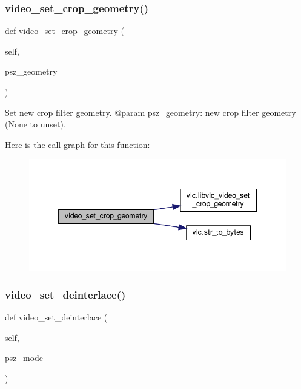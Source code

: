 \subsubsection{\texorpdfstring{video\+\_\+set\+\_\+crop\+\_\+geometry()}{video\_set\_crop\_geometry()}}
{\footnotesize\ttfamily def video\+\_\+set\+\_\+crop\+\_\+geometry (\begin{DoxyParamCaption}\item[{}]{self,  }\item[{}]{psz\+\_\+geometry }\end{DoxyParamCaption})}

\begin{DoxyVerb}Set new crop filter geometry.
@param psz_geometry: new crop filter geometry (None to unset).
\end{DoxyVerb}
 Here is the call graph for this function\+:
\nopagebreak
\begin{figure}[H]
\begin{center}
\leavevmode
\includegraphics[width=346pt]{classvlc_1_1_media_player_a8fb5c5ae9f3a3f03ff8b286a8b2f07f9_cgraph}
\end{center}
\end{figure}
\mbox{\label{classvlc_1_1_media_player_a7e7401a9ec141adb28bd0c1f5c53f6f6}} 
\subsubsection{\texorpdfstring{video\+\_\+set\+\_\+deinterlace()}{video\_set\_deinterlace()}}
{\footnotesize\ttfamily def video\+\_\+set\+\_\+deinterlace (\begin{DoxyParamCaption}\item[{}]{self,  }\item[{}]{psz\+\_\+mode }\end{DoxyParamCaption})}

